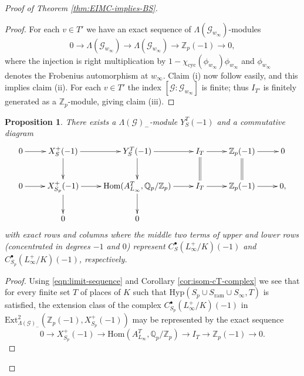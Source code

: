 \documentclass[12pt]{amsart}
\theoremstyle{plain}
\newtheorem{prop}[theorem]{Proposition}
\theoremstyle{remark}
\theoremstyle{definition}
\numberwithin{equation}{section}
\begin{document}
{\begin{proof}[Proof of Theorem \ref{thm:EIMC-implies-BS}]
\begin{proof}
For each $v \in T'$ we have an exact sequence of $\Lambda(\mathcal{G}_{w_{\infty}})$-modules
\begin{equation}\label{eqn:resolution-zp(-1)}
0 \longrightarrow \Lambda(\mathcal{G}_{w_{\infty}}) \longrightarrow \Lambda(\mathcal{G}_{w_{\infty}}) \longrightarrow {\mathbb{Z}}_{p}(-1) \longrightarrow 0,
\end{equation}
where the injection is right multiplication by $1 - \chi_{\mathrm{cyc}}(\phi_{w_{\infty}}) \phi_{w_{\infty}}$
and $\phi_{w_{\infty}}$ denotes the Frobenius automorphism at $w_{\infty}$. 
Claim (i) now follow easily, and this implies claim (ii).
For each $v \in T'$ the index $[\mathcal{G}:\mathcal{G}_{w_{\infty}}]$ is finite; 
thus $I_{T'}$ is finitely generated as a ${\mathbb{Z}}_{p}$-module, giving claim (iii).
\end{proof}

\begin{prop}\label{prop:construction-of-YST(-1)}
There exists a $\Lambda(\mathcal{G})_{-}$-module $Y_{S}^{T} (-1)$ and a commutative diagram
\begin{equation}\label{eqn:complex-diagram} 
\xymatrix{
{0} \ar[r] & X_{S}^{+} (-1) \ar[r] \ar[d] & Y_{S}^{T} (-1) \ar[r] \ar[d] &
I_{T} \ar[r] \ar@{=}[d] & {\mathbb{Z}}_{p}(-1) \ar[r] \ar@{=}[d] & 0\\
{0} \ar[r] & X_{S_{p}}^{+} (-1) \ar[r] \ar[d] &  {\mathrm{Hom}}(A_{L_{\infty}}^{T}, {\mathbb{Q}}_{p} / {\mathbb{Z}}_{p}) \ar[r] \ar[d] &
I_{T} \ar[r] &  {\mathbb{Z}}_{p}(-1) \ar[r] & 0,\\
& 0 & 0 & & &
}\end{equation}
with exact rows and columns
where the middle two terms of upper and lower rows (concentrated in degrees $-1$ and $0$) represent $C_{S}^{\bullet}(L_{\infty}^{+}/K)(-1)$ and $C_{S_{p}}^{\bullet}(L_{\infty}^{+}/K)(-1)$,
respectively.
\end{prop}

\begin{proof}
Using \eqref{eqn:limit-sequence} and Corollary \ref{cor:isom-cT-complex}
we see that for every finite set $T$ of places of $K$ such that ${\mathrm{Hyp}}(S_{p} \cup S_{\mathrm{ram}} \cup S_{\infty},T)$ is satisfied,
the extension class of the complex $C_{S_{p}}^{\bullet}(L_{\infty}^{+}/K)(-1)$ in
${\mathrm{Ext}}^{2}_{\Lambda(\mathcal{G})_{-}} ({\mathbb{Z}}_{p}(-1), X_{S_{p}}^{+} (-1))$ may be represented by the exact sequence
\begin{equation}\label{eqn:ext-rep-I_T}
0 \longrightarrow X_{S_{p}}^{+} (-1) \longrightarrow {\mathrm{Hom}}(A_{L_{\infty}}^{T}, {\mathbb{Q}}_{p} / {\mathbb{Z}}_{p}) \longrightarrow
I_{T} \longrightarrow {\mathbb{Z}}_{p}(-1) \longrightarrow 0.
\end{equation}


\end{proof}
\end{proof}}
\end{document}
